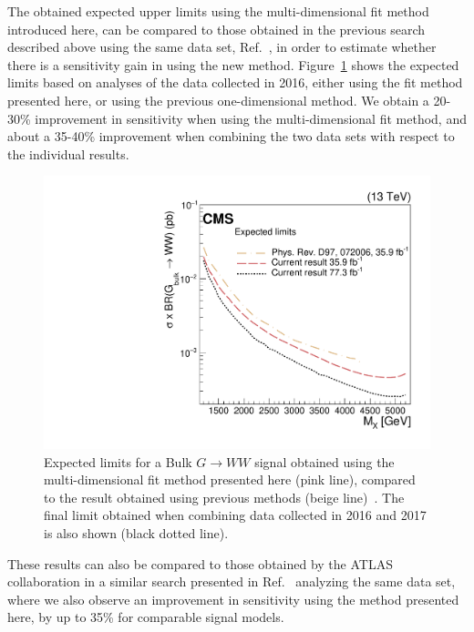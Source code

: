 \documentclass{pasa}%
\begin{document}
The obtained expected upper limits using the multi-dimensional fit method introduced here, can be compared to those obtained in the previous search described above using the same data set, Ref.~\cite{Sirunyan:2017acf}, in order to estimate whether there is a sensitivity gain in using the new method.
Figure~\ref{Fig7} shows the expected limits based on analyses of the data collected in 2016, either using the fit method presented here, or using the previous one-dimensional method. We obtain a 20-30\% improvement in sensitivity when using the multi-dimensional fit method, and about a 35-40\% improvement when combining the two data sets with respect to the individual results.
\begin{figure}[h!]
\centering
 \includegraphics[width=0.79\columnwidth]{figures/compareLimits_compAll_BulkGWW_3D.pdf}
\caption{Expected limits for a Bulk $G\rightarrow WW$ signal obtained using the multi-dimensional fit method presented here (pink line), compared to the result obtained using previous methods (beige line)~\cite{Sirunyan:2017acf}. The final limit obtained when combining data collected in 2016 and 2017 is also shown (black dotted line).}
\label{Fig7}
\end{figure}
These results can also be compared to those obtained by the ATLAS collaboration in a similar search presented in Ref.~\cite{ATLAS-CONF-2018-016} analyzing the same data set, where we also observe an improvement in sensitivity using the method presented here, by up to 35\% for comparable signal models.
\end{document}
